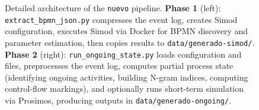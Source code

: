 \documentclass[a4paper]{article}
\begin{document}
\begin{figure}[H]
  \caption{Detailed architecture of the \texttt{nuevo} pipeline. 
           \textbf{Phase 1} (left): \texttt{extract\_bpmn\_json.py} compresses the event log, 
           creates Simod configuration, executes Simod via Docker for BPMN discovery and parameter 
           estimation, then copies results to \texttt{data/generado-simod/}. 
           \textbf{Phase 2} (right): \texttt{run\_ongoing\_state.py} loads configuration and files, 
           preprocesses the event log, computes partial process state (identifying ongoing activities, 
           building N-gram indices, computing control-flow markings), and optionally runs short-term 
           simulation via Prosimos, producing outputs in \texttt{data/generado-ongoing/}.}
  \label{fig:architecture}
\end{figure}
\end{document}
